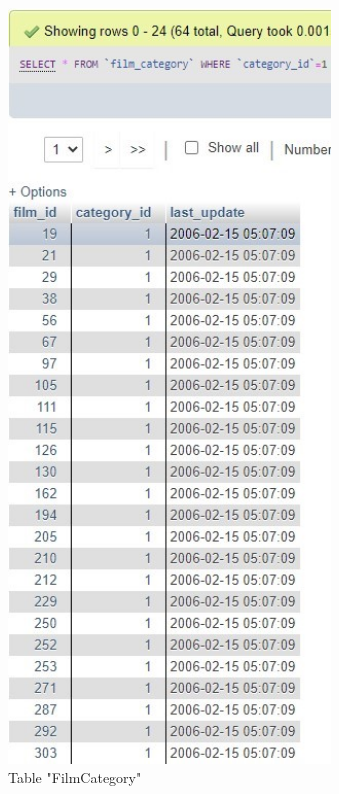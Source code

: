 \documentclass{article}
\begin{document}
		\begin{figure}[H]
			\includegraphics[height = 20cm]{filmcategory_selectwhere}
			\caption{Table "Film\textunderscore Category"}
		\end{figure}
\end{document}
